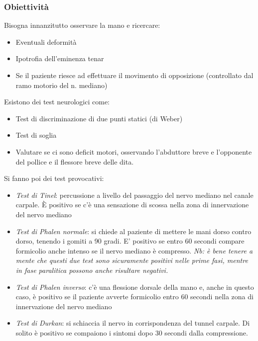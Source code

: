 \subsubsection{Obiettività}

Bisogna innanzitutto osservare la mano e ricercare:

\begin{itemize}
\item
  Eventuali deformità
\item
  Ipotrofia dell'eminenza tenar
\item
  Se il paziente riesce ad effettuare il movimento di opposizione (controllato dal ramo motorio del n. mediano)
\end{itemize}

Esistono dei test neurologici come:

\begin{itemize}
\item
  Test di discriminazione di due punti statici (di Weber)
\item
  Test di soglia
\item
  Valutare se ci sono deficit motori, osservando l'abduttore breve e l'opponente del pollice e il flessore breve delle dita.
\end{itemize}

Si fanno poi dei test provocativi:

\begin{itemize}
\item
  \emph{Test di Tinel}: percussione a livello del passaggio del nervo mediano nel canale carpale. È positivo se c'è una sensazione di scossa nella zona di innervazione del nervo mediano
\item
  \emph{Test di Phalen normale}: si chiede al paziente di mettere le mani dorso contro dorso, tenendo i gomiti a 90 gradi. E' positivo se entro 60 secondi compare formicolio anche intenso se il nervo mediano è compresso.
\emph{\emph{Nb: è bene tenere a mente che questi due test sono sicuramente positivi nelle prime fasi, mentre in fase paralitica possono anche risultare negativi.}}
\item
  \emph{Test di Phalen inverso}: c'è una flessione dorsale della mano e, anche in questo caso, è positivo se il paziente avverte formicolio entro 60 secondi nella zona di innervazione del nervo mediano
\item
  \emph{Test di Durkan}: si schiaccia il nervo in corrispondenza del tunnel carpale. Di solito è positivo se compaiono i sintomi dopo 30 secondi dalla compressione.
\end{itemize}

